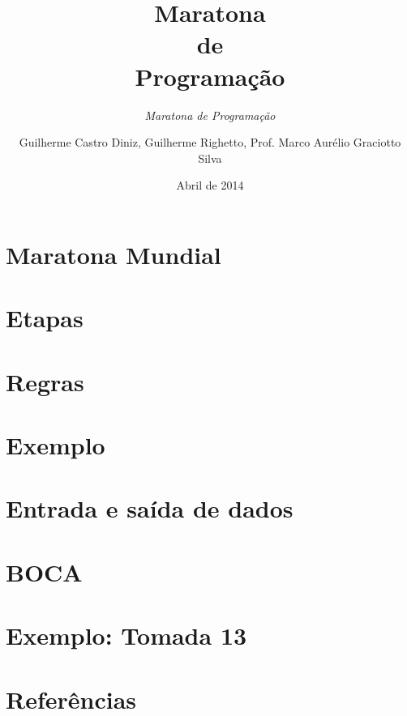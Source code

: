 \documentclass[utf8, usepdftitle=false, svgnames, color={table,
fixpdftex, hyperref, fixinclude, xcdraw}, t, brazil]{beamer}
\title{Maratona\\de\\Programação}
\subtitle{\textit{Maratona de Programação}}
\author[UTFPR-CM]{Guilherme Castro Diniz, Guilherme Righetto, Prof. Marco Aurélio Graciotto Silva}
\date[]{Abril de 2014}
\begin{document}
 \section{Maratona Mundial}
 
 
 \section{Etapas}
 
 
 \section{Regras}
 
 
 \section{Exemplo}
 

 \section{Entrada e saída de dados}
 
 
 \section{BOCA}
 
 
 \section{Exemplo: Tomada 13}
 
 
 \section{Referências}
 
\end{document}

